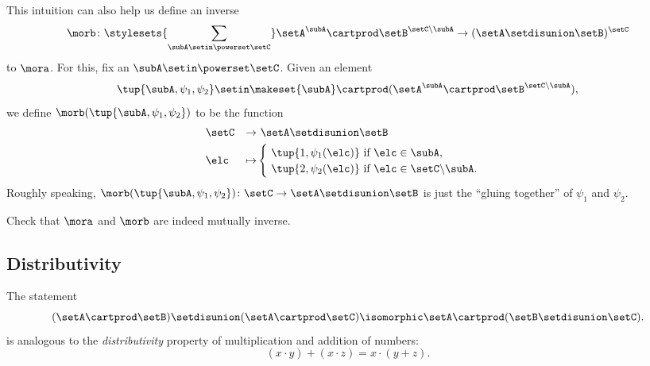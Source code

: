 This intuition can also help us define an inverse
\begin{equation}
    \morb \colon \stylesets{\sum_{\subA \setin \powerset \setC}} \setA^\subA \cartprod \setB^{\setC \backslash \subA} \to (\setA \setdisunion \setB)^{\setC}
\end{equation}
to $\mora$.
For this, fix an $\subA \setin \powerset \setC$.
Given an element
\begin{equation}
    \tup{\subA, \psi_1, \psi_2} \setin \makeset{\subA} \cartprod (\setA^{\subA} \cartprod \setB^{\setC \backslash \subA} ),
\end{equation}
we define $\morb(\tup{\subA, \psi_1, \psi_2})$ to be the function
\begin{equation}
    \begin{aligned}
         & \setC & \to     & \ \setA \setdisunion \setB \\
         & \elc  & \mapsto & \begin{cases} \  \tup{1, \psi_1(\elc)} \text{ if } \elc \in \subA, \\
                                 \ \tup{2, \psi_2(\elc)} \text{ if } \elc \in \setC \backslash \subA.\end{cases}
    \end{aligned}
\end{equation}
Roughly speaking, $\morb(\tup{\subA, \psi_1, \psi_2}) \colon \setC \to \setA \setdisunion \setB$ is just the ``gluing together'' of $\psi_1$ and $\psi_2$.

\begin{gradedexercise}
    Check that $\mora$ and $\morb$ are indeed mutually inverse.
\end{gradedexercise}


\subsection{Distributivity}

The statement
\begin{equation}\label{eq:sets-distributor}
    (\setA \cartprod \setB) \setdisunion (\setA \cartprod \setC)  \isomorphic \setA \cartprod (\setB \setdisunion \setC).
\end{equation}
is analogous to the \emph{distributivity} property of multiplication and addition of numbers:
\begin{equation}\label{eq:arithmetic-distributive-law}
    (x \cdot y) + (x \cdot z)  = x \cdot (y + z).
\end{equation}

